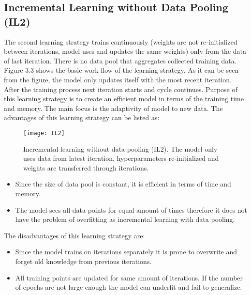 \subsection{Incremental Learning without Data Pooling (IL2)}

The second learning strategy trains continuously (weights are not re-initialized between iterations, model uses and updates the same weights) only from the data of last iteration. There is no data pool that aggregates collected training data. Figure 3.3 shows the basic work flow of the learning strategy. As it can be seen from the figure, the model only updates itself with the most recent iteration. After the training process next iteration starts and cycle continues. Purpose of this learning strategy is to create an efficient model in terms of the training time and memory. The main focus is the adaptivity of model to new data. The advantages of this learning strategy can be listed as:

\begin{figure}[t]
\texttt{[image: IL2]}
\centering
\caption{Incremental learning without data pooling (IL2). The model only uses data from latest iteration, hyperparameters re-initialized and weights are transferred through iterations.}
\end{figure}


\begin{itemize}

\item Since the size of data pool is constant, it is efficient in terms of time and memory.
\item The model sees all data points for equal amount of times therefore it does not have the problem of overfitting as incremental learning with data pooling.

\end{itemize}


The disadvantages of this learning strategy are:

\begin{itemize}

\item Since the model trains on iterations separately it is prone to overwrite and forget old knowledge from previous iterations.
\item All training points are updated for same amount of iterations. If the number of epochs are not large enough the model can underfit and fail to generalize.

\end{itemize}

